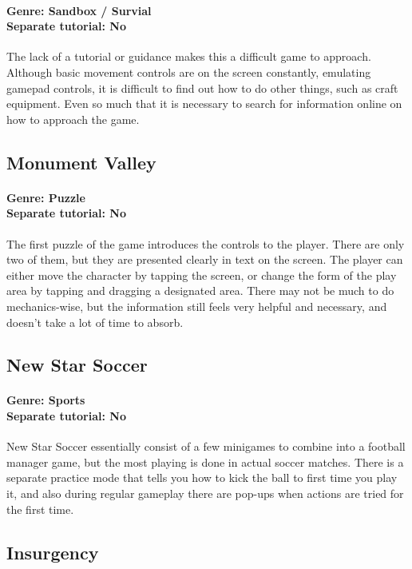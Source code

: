 \paragraph{Genre: Sandbox / Survial \\ Separate tutorial: No \\}
The lack of a tutorial or guidance makes this a difficult game to approach. Although basic movement controls are on the screen constantly, emulating gamepad controls, it is difficult to find out how to do other things, such as craft equipment. Even so much that it is necessary to search for information online on how to approach the game. 

\subsection{Monument Valley}
\paragraph{Genre: Puzzle \\ Separate tutorial: No \\}
The first puzzle of the game introduces the controls to the player. There are only two of them, but they are presented clearly in text on the screen. The player can either move the character by tapping the screen, or change the form of the play area by tapping and dragging a designated area. There may not be much to do mechanics-wise, but the information still feels very helpful and necessary, and doesn't take a lot of time to absorb.

\subsection{New Star Soccer}
\paragraph{Genre: Sports \\ Separate tutorial: No \\}
New Star Soccer essentially consist of a few minigames to combine into a football manager game, but the most playing is done in actual soccer matches. There is a separate practice mode that tells you how to kick the ball to first time you play it, and also during regular gameplay there are pop-ups when actions are tried for the first time.

\subsection{Insurgency}
